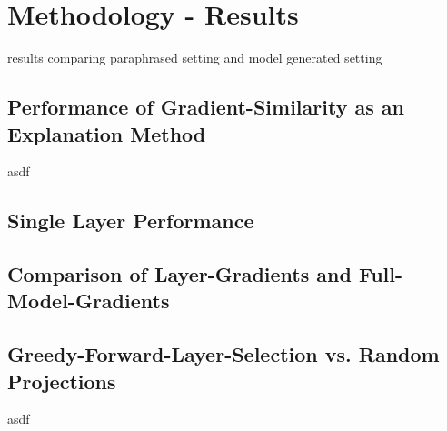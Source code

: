\chapter{Methodology - Results}
results comparing paraphrased setting and model generated setting


\section{Performance of Gradient-Similarity as an Explanation Method}
asdf

\section{Single Layer Performance}

\section{Comparison of Layer-Gradients and Full-Model-Gradients}

\section{Greedy-Forward-Layer-Selection vs. Random Projections}
asdf